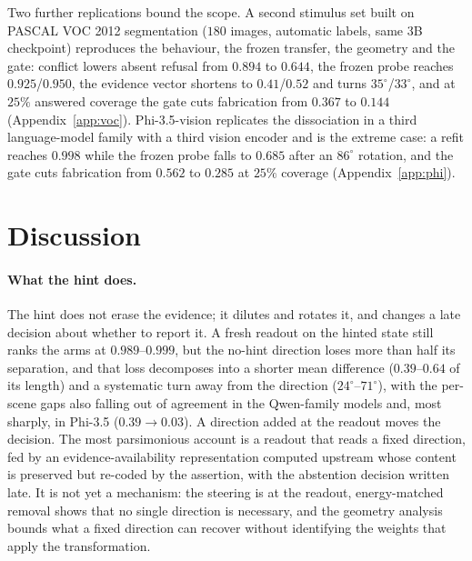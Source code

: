\documentclass[10pt]{article}
\begin{document}
Two further replications bound the scope. A second stimulus set built on PASCAL VOC 2012 segmentation ($180$ images, automatic labels, same 3B checkpoint) reproduces the behaviour, the frozen transfer, the geometry and the gate: conflict lowers absent refusal from $0.894$ to $0.644$, the frozen probe reaches $0.925$/$0.950$, the evidence vector shortens to $0.41$/$0.52$ and turns $35^\circ$/$33^\circ$, and at $25\%$ answered coverage the gate cuts fabrication from $0.367$ to $0.144$ (Appendix~\ref{app:voc}). Phi-3.5-vision replicates the dissociation in a third language-model family with a third vision encoder and is the extreme case: a refit reaches $0.998$ while the frozen probe falls to $0.685$ after an $86^\circ$ rotation, and the gate cuts fabrication from $0.562$ to $0.285$ at $25\%$ coverage (Appendix~\ref{app:phi}).

\section{Discussion}

\paragraph{What the hint does.}
The hint does not erase the evidence; it dilutes and rotates it, and changes a late decision about whether to report it. A fresh readout on the hinted state still ranks the arms at $0.989$--$0.999$, but the no-hint direction loses more than half its separation, and that loss decomposes into a shorter mean difference ($0.39$--$0.64$ of its length) and a systematic turn away from the direction ($24^\circ$--$71^\circ$), with the per-scene gaps also falling out of agreement in the Qwen-family models and, most sharply, in Phi-3.5 ($0.39\to0.03$). A direction added at the readout moves the decision. The most parsimonious account is a readout that reads a fixed direction, fed by an evidence-availability representation computed upstream whose content is preserved but re-coded by the assertion, with the abstention decision written late. It is not yet a mechanism: the steering is at the readout, energy-matched removal shows that no single direction is necessary, and the geometry analysis bounds what a fixed direction can recover without identifying the weights that apply the transformation.
\end{document}
